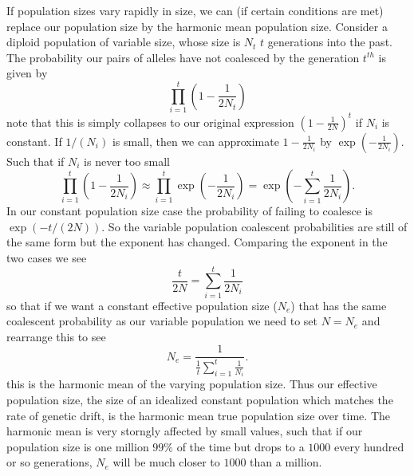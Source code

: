 If population sizes vary rapidly in size, we can (if certain conditions are met)
replace our population size by the harmonic mean population size.
Consider a diploid population of variable size, whose size is $N_t$ $t$ generations into the
past. The probability our pairs of alleles have not coalesced by the generation $t^{th}$ is
given by
\begin{equation}
\prod_{i=1}^{t} \left(1-\frac{1}{2N_t} \right)
\end{equation}
note that this is simply collapses to our original expression
$\left(1-\frac{1}{2N } \right)^t $ if $N_i$ is constant. If $1/(N_i)$ is
small, then we can approximate $1-\frac{1}{2N_i}$ by
$\exp(-\frac{1}{2N_i})$. Such that if $N_i$ is never too small
\begin{equation}
\prod_{i=1}^{t} \left(1-\frac{1}{2N_i} \right)
\approx \prod_{i=1}^{t} \exp \left( -\frac{1}{2N_i} \right)   =
\exp \left(- \sum_{i=1}^{t} \frac{1}{2N_i} \right) .
\end{equation}
In our constant population size case
the probability of failing to coalesce is $\exp(-t/(2N))$. So the
variable population coalescent probabilities are still of the same form but
the exponent has changed. Comparing the exponent in the two cases we see
\begin{equation}
\frac{t}{2N} = \sum_{i=1}^{t} \frac{1}{2N_i}
\end{equation}
so that if we want a constant effective population size ($N_e$) that has the same
coalescent probability as our variable population we need to set
$N=N_e$ and rearrange this to see
\begin{equation}
N_e =\frac{1}{\frac{1}{t} \sum_{i=1}^{t} \frac{1}{N_i} }.
\end{equation}
this is the harmonic mean of the varying population size. Thus our
effective population size, the size of an idealized constant
population which matches the rate of genetic drift, is the harmonic
mean true population size over time. The harmonic mean is very
storngly affected by small values, such that if our population size is
one million $99\%$ of the time but drops to a $1000$ every hundred or
so generations, $N_e$ will be much closer to $1000$ than a million.\\



